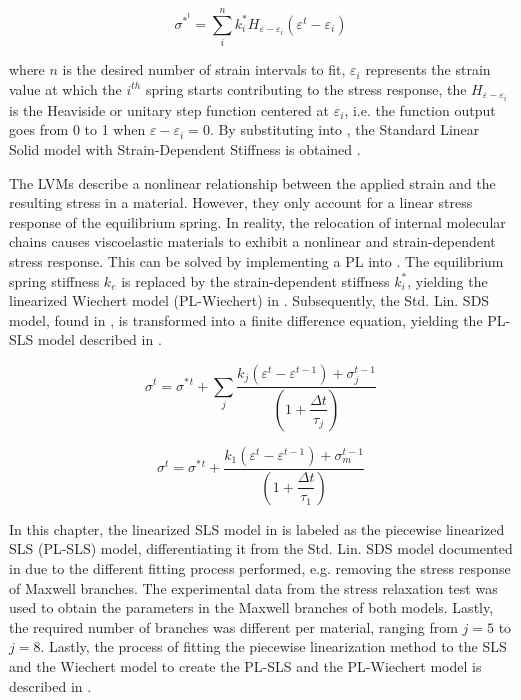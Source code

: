 \begin{equation}
\label{eq5}
\sigma^{*^t} = \sum_i^n k_i^* H_{\varepsilon - \varepsilon_i}(\varepsilon^t - \varepsilon_i)
\end{equation}

\noindent where $n$ is the desired number of strain intervals to fit, $\varepsilon_i$ represents the strain value at which the $i^{th}$ spring starts contributing to the stress response, the $H_{\varepsilon - \varepsilon_i}$ is the Heaviside or unitary step function centered at $\varepsilon_i$, i.e. the function output goes from 0 to 1 when $\varepsilon - \varepsilon_i = 0$. By substituting  into , the Standard Linear Solid model with Strain-Dependent Stiffness is obtained \cite{austin2015control}.

The LVMs describe a nonlinear relationship between the applied strain and the resulting stress in a material. However, they only account for a linear stress response of the equilibrium spring. In reality, the relocation of internal molecular chains causes viscoelastic materials to exhibit a nonlinear and strain-dependent stress response. This can be solved by implementing a PL into . The equilibrium spring stiffness $k_e$ is replaced by the strain-dependent stiffness $k_i^*$, yielding the linearized Wiechert model (PL-Wiechert) in . Subsequently, the Std. Lin. SDS model, found in \cite{austin2015control}, is transformed into a finite difference equation, yielding the PL-SLS model described in .

\begin{equation}
\label{eq6}
\sigma^t = \sigma^*{^t} + \sum_j \frac{k_j (\varepsilon^t-\varepsilon^{t-1}) + \sigma_j^{t-1}}{\left( 1 + \dfrac{\Delta t}{\tau_j}\right) }
\end{equation}

\begin{equation}
\label{eq7}
\sigma^t = \sigma^*{^t} + \frac{k_1(\varepsilon^t - \varepsilon^{t-1}) + \sigma_m^{t-1}}{ \left( 1+\dfrac{\Delta t}{\tau_1} \right) }
\end{equation}

In this chapter, the linearized SLS model in  is labeled as the piecewise linearized SLS (PL-SLS) model, differentiating it from the Std. Lin. SDS model documented in \cite{austin2015control} due to the different fitting process performed, e.g. removing the stress response of Maxwell branches. The experimental data from the stress relaxation test was used to obtain the parameters in the Maxwell branches of both models. Lastly, the required number of branches was different per material, ranging from $j=5$ to $j=8$. Lastly, the process of fitting the piecewise linearization method to the SLS and the Wiechert model to create the PL-SLS and the PL-Wiechert model is described in .

